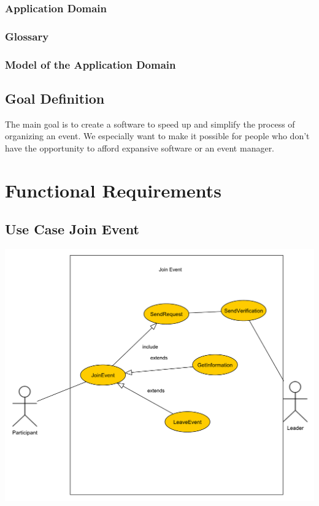 \documentclass[12pt]{article}
\theoremstyle{definition}
\begin{document}
\subsubsection{Application Domain}



\subsubsection{Glossary}

\subsubsection{Model of the Application Domain}

\subsection{Goal Definition}
The main goal is to create a software to speed up and simplify the process of organizing an event. We especially want to make it possible for people who don't have the opportunity to afford expansive software or an event manager.
\pagebreak

\section{Functional Requirements}

\subsection{Use Case Join Event}

\includegraphics[scale=.5]{Usecase/JoinEvent.pdf}
\end{document}
